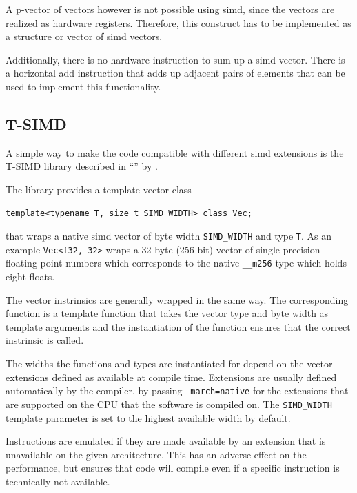 \documentclass[a4paper, 11pt]{memoir}
\begin{document}
    A p-vector of vectors however is not possible using \gls{simd}, since the vectors are realized as hardware registers.
    Therefore, this construct has to be implemented as a structure or vector of \gls{simd} vectors.
    
    Additionally, there is no hardware instruction to sum up a \gls{simd} vector. There is a horizontal add instruction
    that adds up adjacent pairs of elements that can be used to implement this functionality.

    \subsection{T-SIMD}
    \label{sec:tsimd}
    A simple way to make the code compatible with different \gls{simd} extensions is the T-SIMD library described in
    \enquote{} \cite{own_moeller_16_2} by \citeauthor{own_moeller_16_2}.

    The library provides a template vector class
    \begin{verbatim}
template<typename T, size_t SIMD_WIDTH> class Vec;
    \end{verbatim}
    that wraps a native \gls{simd} vector of byte width \texttt{SIMD_WIDTH} and type \texttt{T}. As an
    example \texttt{Vec<f32, 32>} wraps a 32 byte (256 bit) vector of single precision floating point numbers
    which corresponds to the native \texttt{__m256} type which holds eight floats.

    The vector instrinsics are generally wrapped in the same way. The corresponding function is a template function that
    takes the vector type and byte width as template arguments and the instantiation of the function ensures that the
    correct instrinsic is called.

    The widths the functions and types are instantiated for depend on the vector extensions defined as available at compile
    time. Extensions are usually defined automatically by the compiler, \eg by passing \texttt{-march=native} for
    the extensions that are supported on the CPU that the software is compiled on. The \texttt{SIMD_WIDTH}
    template parameter is set to the highest available width by default.

    Instructions are emulated if they are made available by an extension that is unavailable on the given architecture.
    This has an adverse effect on the performance, but ensures that code will compile even if a specific instruction
    is technically not available.
\end{document}
